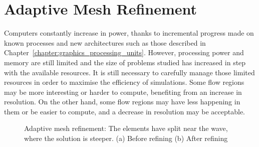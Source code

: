 \chapter{Adaptive Mesh Refinement} \label{chapter:adaptive_mesh_refinement} 

Computers constantly increase in power, thanks to incremental progress made on known processes and
new architectures such as those described in Chapter~\ref{chapter:graphics_processing_units}.
However, processing power and memory are still limited and the size of problems studied has
increased in step with the available resources. It is still necessary to carefully manage those
limited resources in order to maximise the efficiency of simulations. Some flow regions may be more
interesting or harder to compute, benefiting from an increase in resolution. On the other hand, some
flow regions may have less happening in them or be easier to compute, and a decrease in resolution
may be acceptable.

\begin{figure}[H]
	\centering
	\hfill
	\caption{Adaptive mesh refinement: The elements have split near the wave, where the solution is steeper. (a) Before refining (b) After refining}
	\label{fig:mesh_refinement}
\end{figure}

